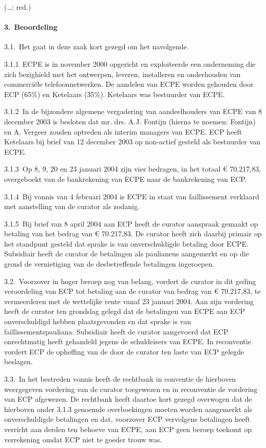 \documentclass[
  dutch,
  a4paper,
]{article}
\begin{document}
(\ldots; red.)

\paragraph{3. Beoordeling}\label{beoordeling}

3.1. Het gaat in deze zaak kort gezegd om het navolgende.

3.1.1 ECPE is in november 2000 opgericht en exploiteerde een onderneming die zich bezighield met het ontwerpen, leveren, installeren en onderhouden van commerciële telefoonnetwerken. De aandelen van ECPE worden gehouden door ECP (65\%) en Ketelaars (35\%). Ketelaars was bestuurder van ECPE.

3.1.2 In de bijzondere algemene vergadering van aandeelhouders van ECPE van 8 december 2003 is besloten dat mr. drs. A.J. Fontijn (hierna te noemen: Fontijn) en A. Vergeer zouden optreden als interim managers van ECPE. ECP heeft Ketelaars bij brief van 12 december 2003 op non-actief gesteld als bestuurder van ECPE.

3.1.3 Op 8, 9, 20 en 23 januari 2004 zijn vier bedragen, in het totaal € 70.217,83, overgeboekt van de bankrekening van ECPE naar de bankrekening van ECP.

3.1.4 Bij vonnis van 4 februari 2004 is ECPE in staat van faillissement verklaard met aanstelling van de curator als zodanig.

3.1.5 Bij brief van 8 april 2004 aan ECP heeft de curator aanspraak gemaakt op betaling van het bedrag van € 70.217,83. De curator heeft zich daarbij primair op het standpunt gesteld dat sprake is van onverschuldigde betaling door ECPE. Subsidiair heeft de curator de betalingen als paulianeus aangemerkt en op die grond de vernietiging van de desbetreffende betalingen ingeroepen.

3.2. Voorzover in hoger beroep nog van belang, vordert de curator in dit geding veroordeling van ECP tot betaling aan de curator van bedrag van € 70.217,83, te vermeerderen met de wettelijke rente vanaf 23 januari 2004. Aan zijn vordering heeft de curator ten grondslag gelegd dat de betalingen van ECPE aan ECP onverschuldigd hebben plaatsgevonden en dat sprake is van faillissementspauliana. Subsidiair heeft de curator aangevoerd dat ECP onrechtmatig heeft gehandeld jegens de schuldeisers van ECPE. In reconventie vordert ECP de opheffing van de door de curator ten laste van ECP gelegde beslagen.

3.3. In het bestreden vonnis heeft de rechtbank in conventie de hierboven weergegeven vordering van de curator toegewezen en in reconventie de vordering van ECP afgewezen. De rechtbank heeft daartoe kort gezegd overwogen dat de hierboven onder 3.1.3 genoemde overboekingen moeten worden aangemerkt als onverschuldigde betalingen en dat, voorzover ECP vervolgens betalingen heeft verricht aan derden ten behoeve van ECPE, aan ECP geen beroep toekomt op verrekening omdat ECP niet te goeder trouw was.
\end{document}
